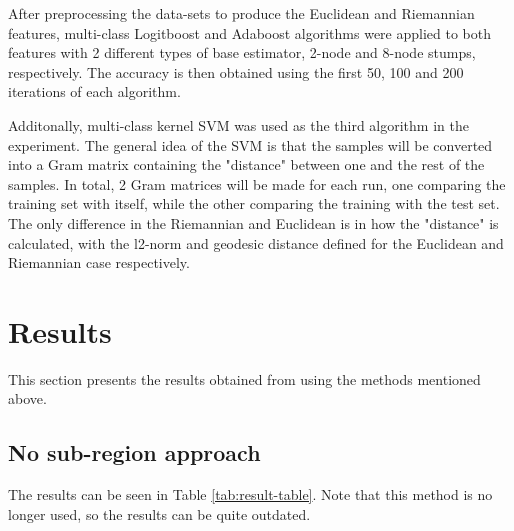\documentclass[12pt]{article}
\begin{document}
\begin{sloppypar}
\noindent
After preprocessing the data-sets to produce the Euclidean and Riemannian features, multi-class Logitboost and Adaboost algorithms were applied to both features with 2 different types of base estimator, 2-node and 8-node stumps, respectively. The accuracy is then obtained using the first 50, 100 and 200 iterations of each algorithm. 

\noindent
Additonally, multi-class kernel SVM was used as the third algorithm in the experiment. The general idea of the SVM is that the samples will be converted into a Gram matrix containing the "distance" between one and the rest of the samples. In total, 2 Gram matrices will be made for each run, one comparing the training set with itself, while the other comparing the training with the test set. The only difference in the Riemannian and Euclidean is in how the "distance" is calculated, with the l2-norm and geodesic distance defined for the Euclidean and Riemannian case respectively.

\section{Results}
This section presents the results obtained from using the methods mentioned above.

\subsection{No sub-region approach}
The results can be seen in Table \ref{tab:result-table}. Note that this method is no longer used, so the results can be quite outdated.


\end{sloppypar}
\end{document}
